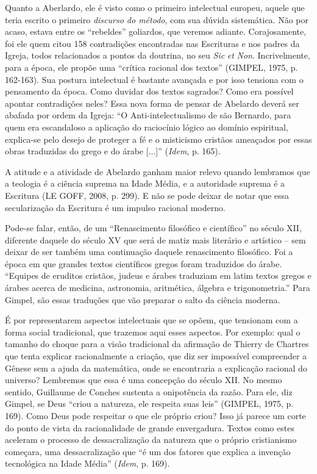 Quanto a Aberlardo, ele é visto como o primeiro intelectual europeu,
aquele que teria escrito o primeiro \emph{discurso do método}, com sua
dúvida sistemática. Não por acaso, estava entre os ``rebeldes''
goliardos, que veremos adiante. Corajosamente, foi ele quem citou 158
contradições encontradas nas Escrituras e nos padres da Igreja, todos
relacionados a pontos da doutrina, no seu \emph{Sic} \emph{et}
\emph{Non}. Incrivelmente, para a época, ele propõe uma ``crítica
racional dos textos'' (GIMPEL, 1975, p. 162-163). Sua postura
intelectual é bastante avançada e por isso tensiona com o pensamento da
época. Como duvidar dos textos sagrados? Como era possível apontar
contradições neles? Essa nova forma de pensar de Abelardo deverá ser
abafada por ordem da Igreja: ``O Anti-intelectualismo de são Bernardo,
para quem era escandaloso a aplicação do raciocínio lógico ao domínio
espiritual, explica-se pelo desejo de proteger a fé e o misticismo
cristãos ameaçados por essas obras traduzidas do grego e do árabe
{[}...{]}'' (\emph{Idem}, p. 165).

A atitude e a atividade de Abelardo ganham maior relevo quando lembramos
que a teologia é a ciência suprema na Idade Média, e a autoridade
suprema é a Escritura (LE GOFF, 2008, p. 299). E não se pode deixar de
notar que essa secularização da Escritura é um impulso racional moderno.

Pode-se falar, então, de um ``Renascimento filosófico e científico'' no
século XII, diferente daquele do século XV que será de matiz mais
literário e artístico -- sem deixar de ser também uma continuação
daquele renascimento filosófico. Foi a época em que grandes textos
científicos gregos foram traduzidos do árabe. ``Equipes de eruditos
cristãos, judeus e árabes traduziam em latim textos gregos e árabes
acerca de medicina, astronomia, aritmética, álgebra e trigonometria.''
Para Gimpel, são essas traduções que vão preparar o salto da ciência
moderna.

É por representarem aspectos intelectuais que se opõem, que tensionam
com a forma social tradicional, que trazemos aqui esses aspectos. Por
exemplo: qual o tamanho do choque para a visão tradicional da afirmação
de Thierry de Chartres que tenta explicar racionalmente a criação, que
diz ser impossível compreender a Gênese sem a ajuda da matemática, onde
se encontraria a explicação racional do universo? Lembremos que essa é
uma concepção do século XII. No mesmo sentido, Guillaume de Conches
sustenta a onipotência da razão. Para ele, diz Gimpel, se Deus ``criou a
natureza, ele respeita suas leis'' (GIMPEL, 1975, p. 169). Como Deus
pode respeitar o que ele próprio criou? Isso já parece um corte do ponto
de vista da racionalidade de grande envergadura. Textos como estes
aceleram o processo de dessacralização da natureza que o próprio
cristianismo começara, uma dessacralização que ``é um dos fatores que
explica a invenção tecnológica na Idade Média'' (\emph{Idem}, p. 169).

